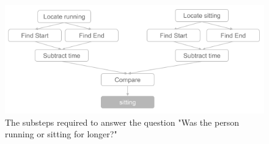 \documentclass[10pt,twocolumn,letterpaper]{article}
\begin{document}
\begin{figure}[t]
\begin{center}
\includegraphics[width=0.8\linewidth]{Figures/figure_composition.png}
\end{center}
   \caption{The substeps required to answer the question "Was the person running or sitting for longer?"}
\label{compositional_substeps}
\end{figure}




\end{document}
